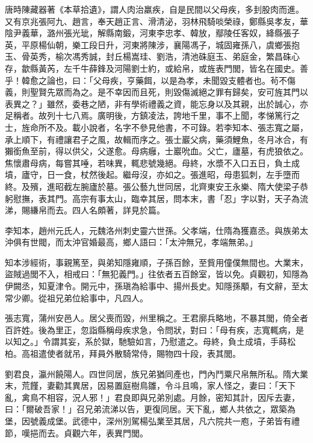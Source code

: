 \begin{pinyinscope}
 唐時陳藏器著《本草拾遺》，謂人肉治羸疾，自是民間以父母疾，多刲股肉而進。又有京兆張阿九、趙言，奉天趙正言、滑清泌，羽林飛騎啖榮祿，鄭縣吳孝友，華陰尹義華，潞州張光玼，解縣南鍛，河東李忠孝、韓放，鄢陵任客奴，絳縣張子英，平原楊仙朝，樂工段日升，河東將陳涉，襄陽馮子，城固雍孫八，虞鄉張抱玉、骨英秀，榆次馮秀誠，封丘楊嵩珪、劉浩，清池硃庭玉、弟庭金，繁昌硃心存，歙縣黃芮，左千牛薛鋒及河陽劉士約，或給帛，或旌表門閭，皆名在國史。善乎！韓愈之論也，曰：「父母疾，亨藥餌，以是為孝，未聞毀支體者也。茍不傷義，則聖賢先眾而為之。是不幸因而且死，則毀傷滅絕之罪有歸矣，安可旌其門以表異之？」雖然，委巷之陋，非有學術禮義之資，能忘身以及其親，出於誠心，亦足稱者。故列十七八焉。廣明後，方鎮凌法，誇地千里，事不上聞，孝悌篤行之士，旌命所不及。載小說者，名字不參見他書，不可錄。若李知本、張志寬之屬，承上順下，有禮讓君子之風，故輯而序之。張士巖父病，藥須鯉魚，冬月冰合，有獺銜魚至前，得以供父，父遂愈。母病癰，士巖吮血。父亡，廬墓，有虎狼依之。焦懷肅母病，每嘗其唾，若味異，輒悲號幾絕。母終，水漿不入口五日，負土成墳，廬守，日一食，杖然後起。繼母沒，亦如之。張進昭，母患狐刺，左手墮而終。及殯，進昭截左腕廬於墓。張公藝九世同居，北齊東安王永樂、隋大使梁子恭躬慰撫，表其門。高宗有事太山，臨幸其居，問本末，書「忍」字以對，天子為流涕，賜縑帛而去。四人名頗著，詳見於篇。



 李知本，趙州元氏人，元魏洛州刺史靈六世孫。父孝端，仕隋為獲嘉丞。與族弟太沖俱有世閥，而太沖官婚最高，鄉人語曰：「太沖無兄，孝端無弟。」



 知本涉經術，事親篤至，與弟知隱雍順，子孫百餘，至貲用僮僕無間也。大業末，盜賊過閭不入，相戒曰：「無犯義門。」往依者五百餘室，皆以免。貞觀初，知隱為伊闕丞，知夏津令。開元中，孫瑱為給事中、揚州長史。知隱孫顒，有文辭，至太常少卿。從祖兄弟位給事中，凡四人。



 張志寬，蒲州安邑人。居父喪而毀，州里稱之。王君廓兵略地，不暴其閭，倚全者百許姓。後為里正，忽詣縣稱母疾求急，令問狀，對曰：「母有疾，志寬輒病，是以知之。」令謂其妄，系於獄，馳驗如言，乃慰遣之。母終，負土成墳，手蒔松柏。高祖遣使者就吊，拜員外散騎常侍，賜物四十段，表其閭。



 劉君良，瀛州饒陽人。四世同居，族兄弟猶同產也，門內鬥粟尺帛無所私。隋大業末，荒饉，妻勸其異居，因易置庭樹鳥雛，令斗且鳴，家人怪之，妻曰：「天下亂，禽鳥不相容，況人邪！」君良即與兄弟別處。月餘，密知其計，因斥去妻，曰：「爾破吾家！」召兄弟流涕以告，更復同居。天下亂，鄉人共依之，眾築為堡，因號義成堡。武德中，深州別駕楊弘業至其居，凡六院共一庖，子弟皆有禮節，嘆挹而去。貞觀六年，表異門閭。




\end{pinyinscope}
